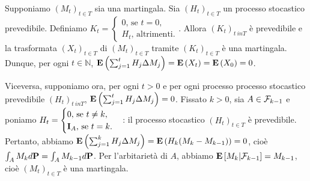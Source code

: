 \Proof Supponiamo $(M_t)_{t \in T}$ sia una martingala. Sia $(H_t)_{t \in T}$ un processo stocastico prevedibile. Definiamo $K_t = \begin{cases} 0\text{, se } t = 0,\\H_t\text{, altrimenti}. \end{cases}$. Allora $(K_t)_{t \ in T}$ \`e prevedibile e la trasformata $(X_t)_{t \in T}$ di $(M_t)_{t \in T}$ tramite $(K_t)_{t \in T}$ \`e una martingala. Dunque, per ogni $t \in \mathbb{N}$,  $\mathbf{E} \left ( \sum_{j = 1}^t H_j \Delta M_j \right ) = \mathbf{E} \left ( X_t \right ) = \mathbf{E} \left ( X_0 \right ) = 0$.
\par Viceversa, supponiamo ora,  per ogni $t > 0$ e per ogni processo processo stocastico prevedibile $(H_t)_{t \ in T}$, $\mathbf{E} \left ( \sum_{j = 1}^t H_j \Delta M_j \right ) = 0$. Fissato $k > 0$, sia $A \in \mathcal{F}_{k - 1}$ e poniamo $H_t = \begin{cases} 0\text{, se }t \neq k,\\\mathbf{I}_{A}\text{, se }t = k. \end{cases}$: il processo stocastico $(H_t)_{t \in T}$ \`e prevedibile. Pertanto, abbiamo $\mathbf{E} \left ( \sum_{j = 1}^k H_j \Delta M_j \right ) = \mathbf{E} \left ( H_k (M_k - M_{k - 1}) \right ) = 0$, cio\`e $\int_A M_k d\Probability = \int_A M_{k - 1} d\Probability$. Per l'arbitariet\`a di $A$, abbiamo $\mathbf{E} \left [M_k|\mathcal{F}_{k - 1} \right ] = M_{k - 1}$, cio\`e $(M_t)_{t \in T}$ \`e una martingala. \EndProof

